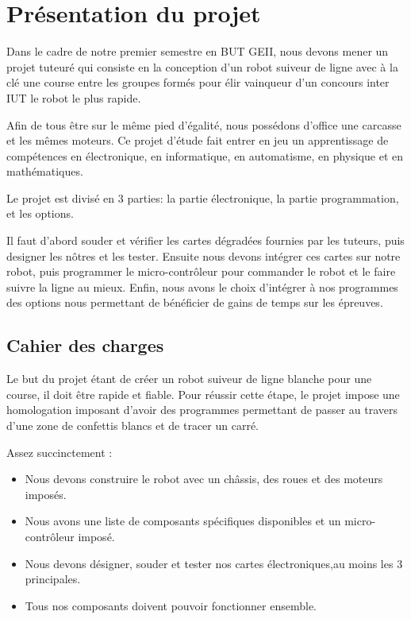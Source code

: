 \section{Présentation du projet}
Dans le cadre de notre premier semestre en BUT GEII, nous devons mener un projet tuteuré qui consiste en la conception d’un robot suiveur de ligne avec à la clé une course entre les groupes formés pour élir vainqueur d’un concours inter IUT le robot le plus rapide.


Afin de tous être sur le même pied d’égalité, nous possédons d’office une carcasse et les mêmes moteurs.
Ce projet d’étude fait entrer en jeu un apprentissage de compétences en électronique, en informatique, en automatisme, en physique et en mathématiques.


Le projet est divisé en 3 parties: la partie électronique, la partie programmation, et les options.


Il faut d’abord souder et vérifier les cartes dégradées fournies par les tuteurs, puis designer les nôtres et les tester.
Ensuite nous devons intégrer ces cartes sur notre robot, puis programmer le micro-contrôleur pour commander le robot et le faire suivre la ligne au mieux.
Enfin, nous avons le choix d’intégrer à nos programmes des options nous permettant de bénéficier de gains de temps sur les épreuves.


\subsection{Cahier des charges}
Le but du projet étant de créer un robot suiveur de ligne blanche pour une course, il doit être rapide et fiable. Pour réussir cette étape, le projet impose une homologation imposant d’avoir des programmes permettant de passer au travers d’une zone de confettis blancs et de tracer un carré. 

\noindent Assez succinctement : 
\begin{itemize}
    \item Nous devons construire le robot avec un châssis, des roues et des moteurs imposés.
    \item Nous avons une liste de composants spécifiques disponibles et un micro-contrôleur imposé.
    \item Nous devons désigner, souder et tester nos cartes électroniques,au moins les 3 principales.
    \item Tous nos composants doivent pouvoir fonctionner ensemble.
\end{itemize}\\

